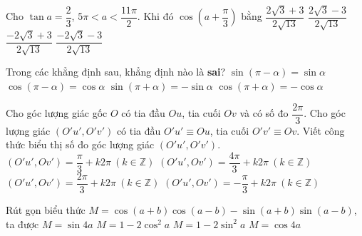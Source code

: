\begin{ex}%
        Cho $\tan a=\dfrac{2}{3}$, $5\pi <a<\dfrac{11\pi}{2}$. Khi đó $\cos \left(a+\dfrac{\pi}{3}\right)$ bằng
        \choice
        {$\dfrac{2\sqrt{3}+3}{2\sqrt{13}}$}
        {\True $\dfrac{2\sqrt{3}-3}{2\sqrt{13}}$}
        {$\dfrac{-2\sqrt{3}+3}{2\sqrt{13}}$}
        {$\dfrac{-2\sqrt{3}-3}{2\sqrt{13}}$}
    \end{ex}

\begin{ex}%
    Trong các khẳng định sau, khẳng định  nào là \textbf{sai}?
    \choice
    {$\sin(\pi-\alpha)=\sin\alpha$}
    {\True $\cos(\pi-\alpha)=\cos \alpha$}
    {$\sin(\pi+\alpha)=-\sin\alpha$}
    {$\cos(\pi+\alpha)=-\cos \alpha$}
\end{ex}

\begin{ex}%
    Cho góc lượng giác gốc $O$ có tia đầu $Ou$, tia cuối $Ov$ và có số đo $\dfrac{2\pi}{3}$. Cho góc lượng giác $(O'u',O'v')$ có tia đầu $O'u'\equiv Ou$, tia cuối $O'v'\equiv Ov$. Viết công thức biểu thị số đo góc lượng giác $(O'u',O'v')$.
\choice
{$(O'u',Ov')=\dfrac{\pi}{3}+k2\pi\ (k\in \mathbb{Z})$}
{$(O'u',Ov')=\dfrac{4\pi}{3}+k2\pi\ (k\in \mathbb{Z})$}
{\True $(O'u',Ov')=\dfrac{2\pi}{3}+k2\pi\ (k\in \mathbb{Z})$}
{$(O'u',Ov')=-\dfrac{\pi}{3}+k2\pi\ (k\in \mathbb{Z})$}
\end{ex}

\begin{ex}%
    Rút gọn biểu thức $M=\cos(a+b)\cos(a-b)-\sin (a+b)\sin(a-b)$, ta được
    \choice
    {$M=\sin 4a$}
    {$M=1-2\cos^2a$}
    {\True $M=1-2\sin^2a$}
    {$M=\cos 4a$}
\end{ex}

